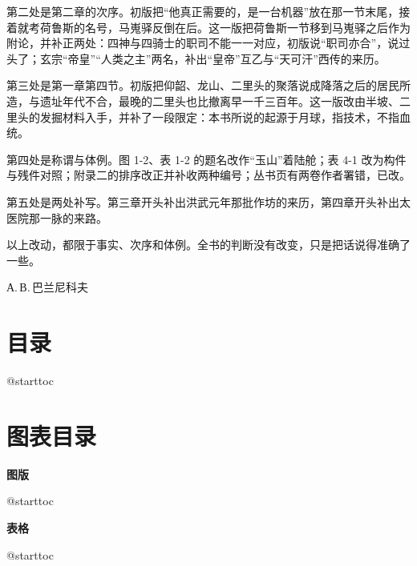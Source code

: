 第二处是第二章的次序。初版把“他真正需要的，是一台机器”放在那一节末尾，接着就考荷鲁斯的名号，马嵬驿反倒在后。这一版把荷鲁斯一节移到马嵬驿之后作为附论，并补正两处：四神与四骑士的职司不能一一对应，初版说“职司亦合”，说过头了；玄宗“帝皇”“人类之主”两名，补出“皇帝”互乙与“天可汗”西传的来历。

第三处是第一章第四节。初版把仰韶、龙山、二里头的聚落说成降落之后的居民所造，与遗址年代不合，最晚的二里头也比撤离早一千三百年。这一版改由半坡、二里头的发掘材料入手，并补了一段限定：本书所说的起源于月球，指技术，不指血统。

第四处是称谓与体例。图 1-2、表 1-2 的题名改作“玉山”着陆舱；表 4-1 改为构件与残件对照；附录二的排序改正并补收两种编号；丛书页有两卷作者署错，已改。

第五处是两处补写。第三章开头补出洪武元年那批作坊的来历，第四章开头补出太医院那一脉的来路。

以上改动，都限于事实、次序和体例。全书的判断没有改变，只是把话说得准确了一些。

\vspace{2mm}
\begin{flushright}
{\small А.\,В.\,巴兰尼科夫}
\end{flushright}

\clearpage
\chapter*{目\quad 录}
{}
\vspace{2mm}
{\linespread{1.16}\selectfont
\csname @starttoc
}

\clearpage
\chapter*{图表目录}
{}
\vspace{2mm}
{\linespread{1.16}\selectfont
{\noindent\sffamily\normalsize\bfseries 图\quad 版\par}
\vspace{2mm}
\csname @starttoc
\vspace{8mm}
{\noindent\sffamily\normalsize\bfseries 表\quad 格\par}
\vspace{2mm}
\csname @starttoc
}
